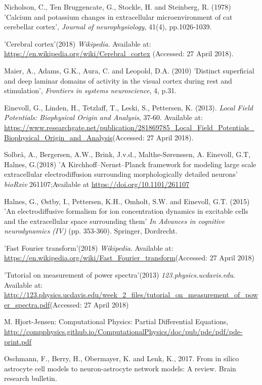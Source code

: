 \documentclass{uiophd}
\begin{document}
\begin{thebibliography}{1}
Nicholson, C., Ten Bruggencate, G., Stockle, H. and Steinberg, R. (1978) 'Calcium and potassium changes in extracellular microenvironment of cat cerebellar cortex', \textit{Journal of neurophysiology}, 41(4), pp.1026-1039.

'Cerebral cortex'(2018) \textit{Wikipedia}. Available at:
\url{https://en.wikipedia.org/wiki/Cerebral\_cortex} (Accessed: 27 April 2018).

Maier, A., Adams, G.K., Aura, C. and Leopold, D.A. (2010) 'Distinct superficial and deep laminar domains of activity in the visual cortex during rest and stimulation', \textit{Frontiers in systems neuroscience}, 4, p.31.

Einevoll, G., Linden, H., Tetzlaff, T., Leski, S., Pettersen, K. (2013). \textit{Local Field Potentials: Biophysical Origin and Analysis}, 37-60. Available at:
\url{https://www.researchgate.net/publication/281869785\_Local\_Field\_Potentials\_Biophysical\_Origin\_and\_Analysis}(Accessed: 27 April 2018).

Solbr\aa, A., Bergersen, A.W., Brink, J.v.d., Malthe-Sørenssen, A. Einevoll, G.T, Halnes, G.(2018)
'A Kirchhoff--Nernst--Planck framework for modeling large scale extracellular electrodiffusion surrounding morphologically detailed neurons'
\textit{bioRxiv} 261107;Available at 
\url{https://doi.org/10.1101/261107}

Halnes, G., Østby, I., Pettersen, K.H., Omholt, S.W. and Einevoll, G.T. (2015) 'An electrodiffusive formalism for ion concentration dynamics in excitable cells and the extracellular space surrounding them' \textit{In Advances in cognitive neurodynamics (IV)} (pp. 353-360). Springer, Dordrecht.

'Fast Fourier transform'(2018) \textit{Wikipedia}. Available at:
\url{https://en.wikipedia.org/wiki/Fast\_Fourier\_transform}(Accessed: 27 April 2018)

'Tutorial on measurement of power spectra'(2013) \textit{123.physics.ucdavis.edu}. Available at:
\url{http://123.physics.ucdavis.edu/week\_2\_files/tutorial\_on\_measurement\_of\_power\_spectra.pdf}(Accessed: 27 April 2018)

M. Hjort-Jensen: Computational Physics: Partial Differential Equations,
\url{http://compphysics.github.io/ComputationalPhysics/doc/pub/pde/pdf/pde-print.pdf}

Oschmann, F., Berry, H., Obermayer, K. and Lenk, K., 2017. From in silico astrocyte cell models to neuron-astrocyte network models: A review. Brain research bulletin.


\end{thebibliography}
\end{document}
